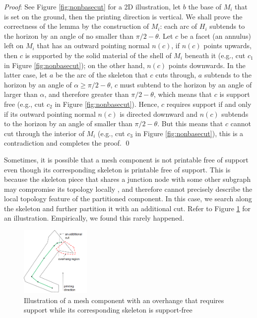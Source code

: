 {{\emph{Proof}:  See Figure \ref{fig:nonbasecut} for a 2D illustration, let $b$ the base of $M_i$ that is set on the ground, then the printing direction is vertical. We shall prove the correctness of the lemma by the construction of $M_i$: each arc of $H_i$ subtends to the horizon by an angle of no smaller than $\pi/2 - \theta$. Let $c$ be a facet (an annulus) left on $M_i$ that has an outward pointing normal $n(c)$, if $n(c)$ points upwards, then $c$ is supported by the solid material of the shell of $M_i$ beneath it (e.g., cut $c_1$ in Figure \ref{fig:nonbasecut}); on the other hand, $n(c)$ points downwards. In the latter case, let $a$ be the arc of the skeleton that $c$ cuts through, $a$ subtends to the horizon by an angle of $\alpha \geq  \pi/2 - \theta$, $c$ must subtend to the horizon by an angle of larger than $\alpha$, and therefore greater than $\pi/2 - \theta$, which means that $c$ is support free (e.g., cut $c_2$ in Figure \ref{fig:nonbasecut}).
Hence, $c$ requires support if and only if its outward pointing normal $n(c)$ is directed downward and $n(c)$ subtends to the horizon by an angle of smaller than $\pi/2 - \theta$. But this means that $c$ cannot cut through the interior of $M_i$ (e.g., cut $c_3$ in Figure \ref{fig:nonbasecut}), this is a contradiction and completes the proof. \qed }}


Sometimes, it is possible that a mesh component is not printable free of support even though its corresponding skeleton is printable free of support. This is because the skeleton piece that shares a junction node with some other subgraph may compromise its topology locally \cite{AuTCCL08}, and therefore cannot precisely describe the local topology feature of the partitioned component. In this case, we search along the skeleton and further partition it with an additional cut. Refer to Figure \ref{fig:arm} for an illustration. Empirically, we found this rarely happened.

\begin{figure}[tbp]
  \centering
  \includegraphics[width=0.3\textwidth]{figs/arm.png}
  \caption{\label{fig:arm}%
           Illustration of a mesh component with an overhange that requires support while its corresponding skeleton is support-free}
\end{figure}









